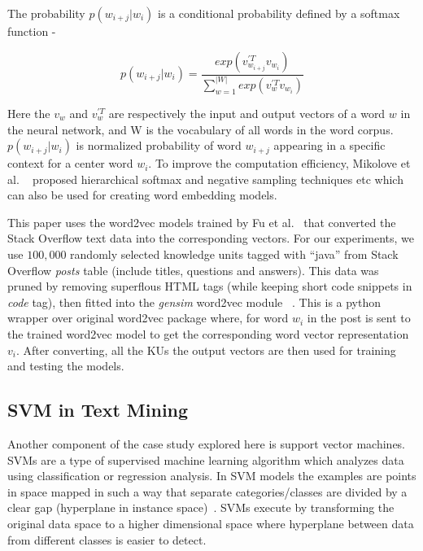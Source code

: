 \documentclass[sigconf]{acmart}
\theoremstyle{break}
\begin{document}
    The  probability $p(w_{i+j}|w_i)$ is a conditional probability defined by a softmax function -
    
    \begin{equation}
        p(w_{i+j}|w_i) = \frac{exp(v_{w_{i+j}}^{'T}v_{w_i})}{\sum_{w=1}^{|W|}exp(v_{w}^{'T}v_{w_i})}
    \end{equation}
    
    Here the $v_{w}$ and $v_{w}^{'T}$ are respectively the input and output vectors of a word $w$ in the neural network, and W is the vocabulary of all words in the word corpus. $p(w_{i+j}|w_i)$ is normalized probability of word $w_{i+j}$ appearing in a specific context for a center word $w_i$. To improve the computation efficiency, Mikolove et al. ~\cite{mikolov2013distributed} proposed
    hierarchical softmax and negative sampling techniques etc which can also be used for creating word embedding models.
    
    This paper uses the word2vec models trained by Fu et al.~\cite{fu2017easy} that converted the Stack Overflow text data into the corresponding vectors. For our experiments, 
    we use    $100,000$ randomly selected  knowledge units tagged with ``java'' from
    Stack Overflow {\it posts} table  (include titles, questions and answers).
    This data was pruned by removing superflous
    HTML tags (while keeping short code snippets in {\it code} tag), then fitted  into the {\it gensim} word2vec module ~\cite{rehurek2010software}.
    This is  a python wrapper over original word2vec package where,  for   word $w_i$ in the post is sent to the trained word2vec model to get the corresponding word vector representation $v_i$. After converting, all the KUs the output vectors are then used for training and testing the models.
    
    \subsection{SVM in Text Mining}
    \label{sssec:SVM in Text Mining}
    Another component  of the case study explored here is support vector machines.
    SVMs are a type of supervised machine learning algorithm which analyzes data using classification or regression analysis. In SVM models the examples are points in space mapped in such a way that separate categories/classes are divided by a clear gap (hyperplane in instance space)~\cite{suykens1999least}.
    SVMs execute by  transforming the original data space to a higher dimensional space where hyperplane between data from different classes is easier to detect.
    
\end{document}
